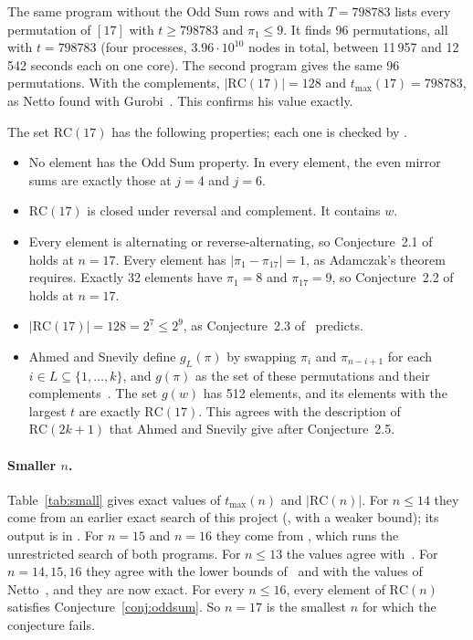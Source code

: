 \documentclass[11pt]{article}
\theoremstyle{remark}
\newcommand{\RC}{\mathrm{RC}}
\newcommand{\tmax}{t_{\max}}
\begin{document}
The same program without the Odd Sum rows and with $T = 798783$ lists every permutation of $[17]$ with $t \ge 798783$ and $\pi_1 \le 9$. It finds 96 permutations, all with $t = 798783$ (four processes, $3.96 \cdot 10^{10}$ nodes in total, between 11\,957 and 12\,542 seconds each on one core). The second program gives the same 96 permutations. With the complements, $|\mathrm{RC}(17)| = 128$ and $\tmax(17) = 798783$, as Netto found with Gurobi~\cite{Netto}. This confirms his value exactly.

The set $\RC(17)$ has the following properties; each one is checked by .
\begin{itemize}
\item No element has the Odd Sum property. In every element, the even mirror sums are exactly those at $j = 4$ and $j = 6$.
\item $\RC(17)$ is closed under reversal and complement. It contains $w$.
\item Every element is alternating or reverse-alternating, so Conjecture~2.1 of~\cite{AS} holds at $n = 17$. Every element has $|\pi_1 - \pi_{17}| = 1$, as Adamczak's theorem~\cite{Ad1} requires. Exactly 32 elements have $\pi_1 = 8$ and $\pi_{17} = 9$, so Conjecture~2.2 of~\cite{AS} holds at $n = 17$.
\item $|\RC(17)| = 128 = 2^7 \le 2^{9}$, as Conjecture~2.3 of~\cite{AS} predicts.
\item Ahmed and Snevily define $g_L(\pi)$ by swapping $\pi_i$ and $\pi_{n-i+1}$ for each $i \in L \subseteq \{1, \dots, k\}$, and $g(\pi)$ as the set of these permutations and their complements~\cite[Section 2]{AS}. The set $g(w)$ has 512 elements, and its elements with the largest $t$ are exactly $\RC(17)$. This agrees with the description of $\RC(2k+1)$ that Ahmed and Snevily give after Conjecture~2.5.
\end{itemize}

\paragraph{Smaller $n$.}
Table~\ref{tab:small} gives exact values of $\tmax(n)$ and $|\RC(n)|$. For $n \le 14$ they come from an earlier exact search of this project (, with a weaker bound); its output is in . For $n = 15$ and $n = 16$ they come from , which runs the unrestricted search of both programs. For $n \le 13$ the values agree with~\cite{AS}. For $n = 14, 15, 16$ they agree with the lower bounds of~\cite{AS} and with the values of Netto~\cite{Netto}, and they are now exact. For every $n \le 16$, every element of $\RC(n)$ satisfies Conjecture~\ref{conj:oddsum}. So $n = 17$ is the smallest $n$ for which the conjecture fails.
\end{document}
